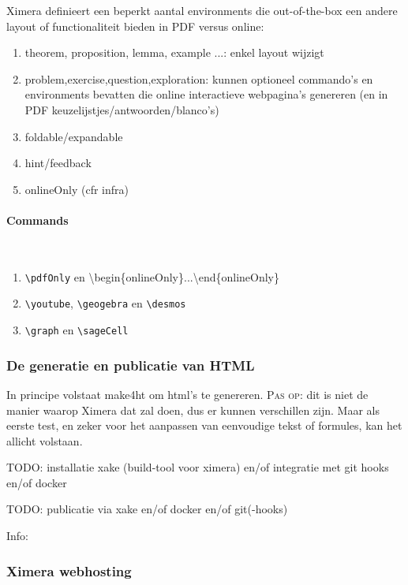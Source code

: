 \documentclass{ximera}
\begin{document}
Ximera definieert een beperkt aantal environments die out-of-the-box een andere layout of functionaliteit bieden in PDF versus online:
\begin{enumerate}
    \item theorem, proposition, lemma, example ...: enkel layout wijzigt
    \item problem,exercise,question,exploration: kunnen optioneel commando's en environments bevatten die online interactieve webpagina's genereren (en in PDF keuzelijstjes/antwoorden/blanco's)
    \item foldable/expandable
    \item hint/feedback
    \item onlineOnly (cfr infra)
\end{enumerate}
    
\paragraph{Commands} \ 

\begin{enumerate}
    \item \verb|\pdfOnly| en \textbackslash begin\{onlineOnly\}...\textbackslash end\{onlineOnly\}
    \item \verb|\youtube|, \verb|\geogebra|  en \verb|\desmos|
    \item \verb|\graph| en \verb|\sageCell|
\end{enumerate}


\subsubsection{De generatie en publicatie van HTML}

In principe volstaat make4ht om html's te genereren. \textsc{Pas op:} dit is niet de manier waarop Ximera dat zal doen, dus er kunnen verschillen zijn. Maar als eerste test, en zeker voor het aanpassen van eenvoudige tekst of formules,  kan het allicht volstaan.


TODO: installatie xake   (build-tool voor ximera) en/of integratie met git hooks en/of docker

TODO: publicatie via xake en/of docker en/of git(-hooks)


Info: 

\subsubsection{Ximera webhosting}
\end{document}
